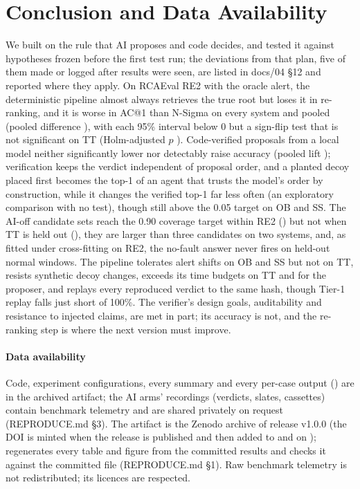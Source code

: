 \section{Conclusion and Data Availability}
\label{sec:conclusion}

We built \sys on the rule that AI proposes and code decides, and tested it against hypotheses frozen before the first test run; the deviations from that plan, five of them made or logged after results were seen, are listed in docs/04 §12 and reported where they apply.
On RCAEval RE2 with the oracle alert, the deterministic pipeline almost always retrieves the true root but loses it in re-ranking, and it is worse in AC@1 than N-Sigma on every system and pooled (pooled difference ), with each 95\% interval below 0 but a sign-flip test that is not significant on TT (Holm-adjusted $p$ ).
Code-verified proposals from a local model neither significantly lower nor detectably raise accuracy (pooled lift ); verification keeps the verdict independent of proposal order, and a planted decoy placed first becomes the top-1 of an agent that trusts the model's order by construction, while it changes the verified top-1 far less often (an exploratory comparison with no test), though still above the 0.05 target on OB and SS.
The AI-off candidate sets reach the 0.90 coverage target within RE2 () but not when TT is held out (), they are larger than three candidates on two systems, and, as fitted under cross-fitting on RE2, the no-fault answer never fires on held-out normal windows.
The pipeline tolerates alert shifts on OB and SS but not on TT, resists synthetic decoy changes, exceeds its time budgets on TT and for the proposer, and replays every reproduced verdict to the same hash, though Tier-1 replay falls just short of 100\%.
The verifier's design goals, auditability and resistance to injected claims, are met in part; its accuracy is not, and the re-ranking step is where the next version must improve.

\paragraph{Data availability}
Code, experiment configurations, every summary and every per-case output () are in the archived artifact; the AI arms' recordings (verdicts, slates, cassettes) contain benchmark telemetry and are shared privately on request (REPRODUCE.md §3).
The artifact is the Zenodo archive of release v1.0.0 (the DOI is minted when the release is published and then added to  and  on );  regenerates every table and figure from the committed results and checks it against the committed file (REPRODUCE.md §1).
Raw benchmark telemetry is not redistributed; its licences are respected.
